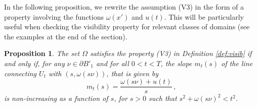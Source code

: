\documentclass[a4paper,reqno,11pt]{amsart}
\newtheorem{proposition}[theorem]{Proposition}
\newcommand{\de}{\partial}
\begin{document}
In the following proposition, we rewrite the assumption (V3) in the form of a property involving the functions $\omega(x')$ and $u(t)$. This will be particularly useful when checking the visibility property for relevant classes of domains (see the examples at the end of the section).
\begin{proposition} \label{prop:equivisib}
The set $\Omega$ satisfies the property (V3) in Definition \ref{def:visib} if and only if, for any $\nu \in \de B'_1$ and for all $0 < t < T$, the slope $m_t(s)$ of the line connecting $U_t$ with $(s,\omega(s\nu))$, that is given by
\begin{equation*}
m_t(s) = \dfrac{\omega(s\nu) + u(t)}{s} \, ,
\end{equation*}
is non-increasing as a function of $s$, for $s > 0$ such that $s^{2} + \omega(s\nu)^{2} < t^2$.
\end{proposition}
\end{document}
